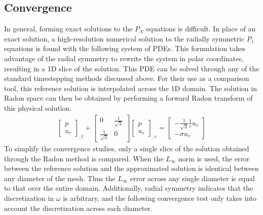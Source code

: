 \subsection{Convergence}

In general, forming exact solutions to the $P_N$ equations is difficult.
In place of an exact solution, a high-resolution numerical solution to the radially symmetric $P_1$ equations is found with the following system of PDEs.
This formulation takes advantage of the radial symmetry to rewrite the system in polar coordinates, resulting in a 1D slice of the solution.
This PDE can be solved through any of the standard timestepping methods discussed above.
For their use as a comparison tool, this reference solution is interpolated across the 1D domain.
The solution in Radon space can then be obtained by performing a forward Radon transform of this physical solution.
\begin{align*}
	\begin{bmatrix}
		p \\
		u_{r}
	\end{bmatrix}_{, t} + 
	\begin{bmatrix}
		0 & \frac{1}{\sqrt{3}} \\
		\frac{1}{\sqrt{3}} & 0
	\end{bmatrix}
	\begin{bmatrix}
		p \\
		u_{r}
	\end{bmatrix}_{, r} = 
	\begin{bmatrix}
		-\frac{1}{\sqrt{3}} \frac{1}{r} u_{r} \\
		-\sigma u_{r}
	\end{bmatrix}
\end{align*}
To simplify the convergence studies, only a single slice of the solution obtained through the Radon method is compared.
When the $L_\infty$ norm is used, the error between the reference solution and the approximated solution is identical between any diameter of the mesh.
Thus the $L_\infty$ error across any single diameter is equal to that over the entire domain.
Additionally, radial symmetry indicates that the discretization in $\omega$ is arbitrary, and the following convergence test only takes into account the discretization across each diameter.
